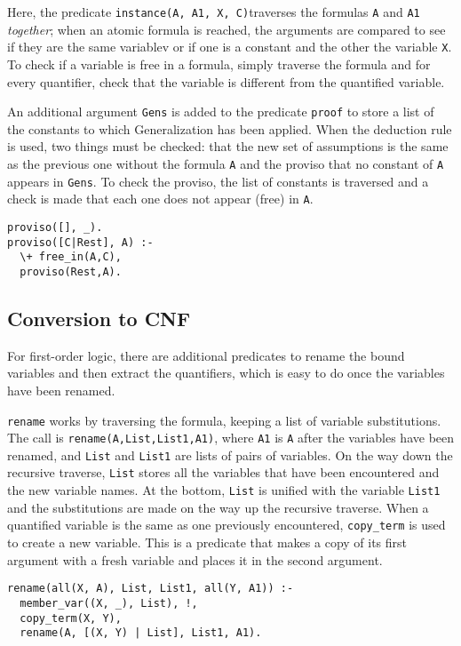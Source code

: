 \documentclass[11pt]{article}
\newcommand*{\p}[1]{\textup{\texttt{#1}}}
\begin{document}
Here, the predicate \p{instance(A, A1, X, C)}traverses the formulas
\p{A} and \p{A1} \emph{together}; when an atomic formula is reached, the
arguments are compared to see if they are the same variablev or if one
is a constant and the other the variable \p{X}. To check if a variable
is free in a formula, simply traverse the formula and for every
quantifier, check that the variable is different from the quantified
variable.

An additional argument \p{Gens} is added to the predicate \p{proof} to
store a list of the constants to which Generalization has been applied.
When the deduction rule is used, two things must be checked: that the
new set of assumptions is the same as the previous one without the
formula \p{A} and the proviso that no constant of \p{A} appears in
\p{Gens}. To check the proviso, the list of constants is traversed and a
check is made that each one does not appear (free) in \p{A}.

\begin{verbatim}
proviso([], _).
proviso([C|Rest], A) :-
  \+ free_in(A,C),
  proviso(Rest,A).
\end{verbatim}




\subsection{Conversion to CNF}

For first-order logic, there are additional predicates to rename the
bound variables and then extract the quantifiers, which is easy to do
once the variables have been renamed.

\p{rename} works by traversing the formula, keeping a list of variable
substitutions. The call is \p{rename(A,List,List1,A1)}, where \p{A1} is
\p{A} after the variables have been renamed, and \p{List} and \p{List1}
are lists of pairs of variables. On the way down the recursive traverse,
\p{List} stores all the variables that have been encountered and the new
variable names. At the bottom, \p{List} is unified with the variable
\p{List1} and the substitutions are made on the way up the recursive
traverse. When a quantified variable is the same as one previously
encountered, \p{copy\_term} is used to create a new variable. This is a
predicate that makes a copy of its first argument with a fresh variable
and places it in the second argument.

\begin{verbatim}
rename(all(X, A), List, List1, all(Y, A1)) :-
  member_var((X, _), List), !,
  copy_term(X, Y),
  rename(A, [(X, Y) | List], List1, A1).
\end{verbatim}
\end{document}
